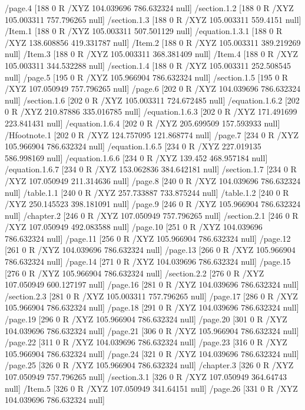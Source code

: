 {{{{{{{/page.4 [188 0 R /XYZ 104.039696 786.632324 null]
/section.1.2 [188 0 R /XYZ 105.003311 757.796265 null]
/section.1.3 [188 0 R /XYZ 105.003311 559.4151 null]
/Item.1 [188 0 R /XYZ 105.003311 507.501129 null]
/equation.1.3.1 [188 0 R /XYZ 138.608856 419.331787 null]
/Item.2 [188 0 R /XYZ 105.003311 389.219269 null]
/Item.3 [188 0 R /XYZ 105.003311 368.381409 null]
/Item.4 [188 0 R /XYZ 105.003311 344.532288 null]
/section.1.4 [188 0 R /XYZ 105.003311 252.508545 null]
/page.5 [195 0 R /XYZ 105.966904 786.632324 null]
/section.1.5 [195 0 R /XYZ 107.050949 757.796265 null]
/page.6 [202 0 R /XYZ 104.039696 786.632324 null]
/section.1.6 [202 0 R /XYZ 105.003311 724.672485 null]
/equation.1.6.2 [202 0 R /XYZ 210.87886 335.016785 null]
/equation.1.6.3 [202 0 R /XYZ 171.491699 223.841431 null]
/equation.1.6.4 [202 0 R /XYZ 205.699509 157.593933 null]
/Hfootnote.1 [202 0 R /XYZ 124.757095 121.868774 null]
/page.7 [234 0 R /XYZ 105.966904 786.632324 null]
/equation.1.6.5 [234 0 R /XYZ 227.019135 586.998169 null]
/equation.1.6.6 [234 0 R /XYZ 139.452 468.957184 null]
/equation.1.6.7 [234 0 R /XYZ 153.062836 384.642181 null]
/section.1.7 [234 0 R /XYZ 107.050949 211.314636 null]
/page.8 [240 0 R /XYZ 104.039696 786.632324 null]
/table.1.1 [240 0 R /XYZ 257.733887 733.875244 null]
/table.1.2 [240 0 R /XYZ 250.145523 398.181091 null]
/page.9 [246 0 R /XYZ 105.966904 786.632324 null]
/chapter.2 [246 0 R /XYZ 107.050949 757.796265 null]
/section.2.1 [246 0 R /XYZ 107.050949 492.083588 null]
/page.10 [251 0 R /XYZ 104.039696 786.632324 null]
/page.11 [256 0 R /XYZ 105.966904 786.632324 null]
/page.12 [261 0 R /XYZ 104.039696 786.632324 null]
/page.13 [266 0 R /XYZ 105.966904 786.632324 null]
/page.14 [271 0 R /XYZ 104.039696 786.632324 null]
/page.15 [276 0 R /XYZ 105.966904 786.632324 null]
/section.2.2 [276 0 R /XYZ 107.050949 600.127197 null]
/page.16 [281 0 R /XYZ 104.039696 786.632324 null]
/section.2.3 [281 0 R /XYZ 105.003311 757.796265 null]
/page.17 [286 0 R /XYZ 105.966904 786.632324 null]
/page.18 [291 0 R /XYZ 104.039696 786.632324 null]
/page.19 [296 0 R /XYZ 105.966904 786.632324 null]
/page.20 [301 0 R /XYZ 104.039696 786.632324 null]
/page.21 [306 0 R /XYZ 105.966904 786.632324 null]
/page.22 [311 0 R /XYZ 104.039696 786.632324 null]
/page.23 [316 0 R /XYZ 105.966904 786.632324 null]
/page.24 [321 0 R /XYZ 104.039696 786.632324 null]
/page.25 [326 0 R /XYZ 105.966904 786.632324 null]
/chapter.3 [326 0 R /XYZ 107.050949 757.796265 null]
/section.3.1 [326 0 R /XYZ 107.050949 364.64743 null]
/Item.5 [326 0 R /XYZ 107.050949 341.64151 null]
/page.26 [331 0 R /XYZ 104.039696 786.632324 null]
}}}}}}}
